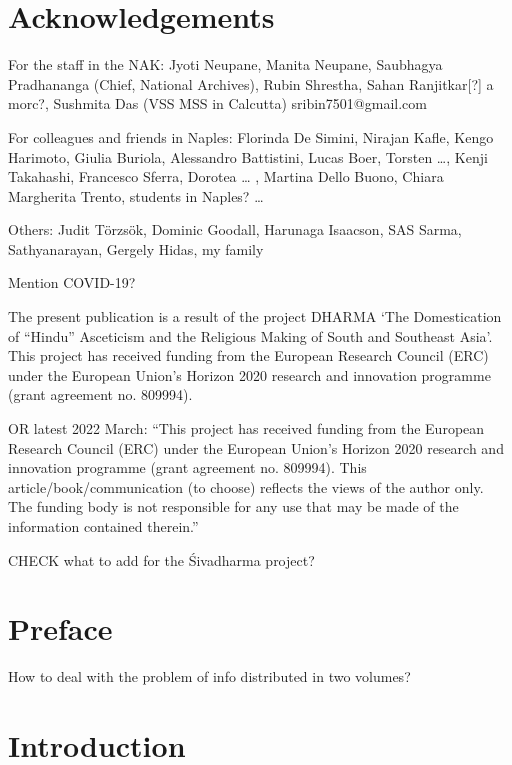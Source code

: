 \documentclass[]{article}
\date{}
\begin{document}
\hypertarget{acknowledgements}{%
\section{Acknowledgements}\label{acknowledgements}}

For the staff in the NAK: Jyoti Neupane, Manita Neupane, Saubhagya
Pradhananga (Chief, National Archives), Rubin Shrestha, Sahan
Ranjitkar{[}?{]} a morc?, Sushmita Das (VSS MSS in Calcutta)
sribin7501@gmail.com

For colleagues and friends in Naples: Florinda De Simini, Nirajan Kafle,
Kengo Harimoto, Giulia Buriola, Alessandro Battistini, Lucas Boer,
Torsten \ldots{}, Kenji Takahashi, Francesco Sferra, Dorotea \ldots{} ,
Martina Dello Buono, Chiara Margherita Trento, students in Naples?
\ldots{}

Others: Judit Törzsök, Dominic Goodall, Harunaga Isaacson, SAS Sarma,
Sathyanarayan, Gergely Hidas, my family

Mention COVID-19?

The present publication is a result of the project DHARMA `The
Domestication of ``Hindu'' Asceticism and the Religious Making of South
and Southeast Asia'. This project has received funding from the European
Research Council (ERC) under the European Union's Horizon 2020 research
and innovation programme (grant agreement no. 809994).

OR latest 2022 March: ``This project has received funding from the
European Research Council (ERC) under the European Union's Horizon 2020
research and innovation programme (grant agreement no. 809994). This
article/book/communication (to choose) reflects the views of the author
only. The funding body is not responsible for any use that may be made
of the information contained therein.''

CHECK what to add for the Śivadharma project?

\pagebreak

\hypertarget{preface}{%
\section{Preface}\label{preface}}

How to deal with the problem of info distributed in two volumes?

\hypertarget{introduction}{%
\section{Introduction}\label{introduction}}
\end{document}
